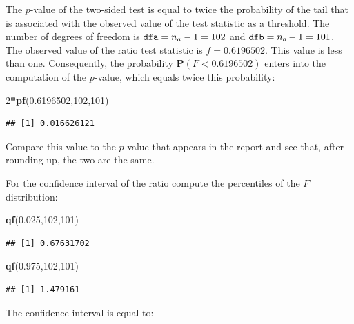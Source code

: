 \documentclass[]{krantz}
\makeatletter
\newenvironment{Shaded}{\begin{snugshade}}{\end{snugshade}}
\newcommand{\DecValTok}[1]{\textcolor[rgb]{0.00,0.00,0.81}{#1}}
\newcommand{\FloatTok}[1]{\textcolor[rgb]{0.00,0.00,0.81}{#1}}
\newcommand{\KeywordTok}[1]{\textcolor[rgb]{0.13,0.29,0.53}{\textbf{#1}}}
\newcommand{\NormalTok}[1]{#1}
\newcommand{\OperatorTok}[1]{\textcolor[rgb]{0.81,0.36,0.00}{\textbf{#1}}}
\newcommand{\Prob}{\mathbf{P}}
\newenvironment{kframe}{%
\medskip{}
\setlength{\fboxsep}{.8em}
 \def\at@end@of@kframe{}%
 \ifinner\ifhmode%
  \def\at@end@of@kframe{\end{minipage}}%
  \begin{minipage}{\columnwidth}%
 \fi\fi%
 \def\FrameCommand##1{\hskip\@totalleftmargin \hskip-\fboxsep
 \colorbox{shadecolor}{##1}\hskip-\fboxsep
     \hskip-\linewidth \hskip-\@totalleftmargin \hskip\columnwidth}%
 \MakeFramed {\advance\hsize-\width
   \@totalleftmargin\z@ \linewidth\hsize
   \@setminipage}}%
 {\par\unskip\endMakeFramed%
 \at@end@of@kframe}
\renewenvironment{Shaded}{\begin{kframe}}{\end{kframe}}
\theoremstyle{definition}
\theoremstyle{definition}
\theoremstyle{definition}
\theoremstyle{remark}
\makeatother
\begin{document}
The \(p\)-value of the two-sided test is equal to twice the probability of
the tail that is associated with the observed value of the test
statistic as a threshold. The number of degrees of freedom is
\(\mbox{\texttt{dfa}} = n_a - 1 = 102\) and
\(\mbox{\texttt{dfb}} = n_b - 1 = 101\). The observed value of the ratio
test statistic is \(f = 0.6196502\). This value is less than one.
Consequently, the probability \(\Prob(F < 0.6196502)\) enters into the
computation of the \(p\)-value, which equals twice this probability:

\begin{Shaded}
\begin{Highlighting}[]
\DecValTok{2}\OperatorTok{*}\KeywordTok{pf}\NormalTok{(}\FloatTok{0.6196502}\NormalTok{,}\DecValTok{102}\NormalTok{,}\DecValTok{101}\NormalTok{)}
\end{Highlighting}
\end{Shaded}

\begin{verbatim}
## [1] 0.016626121
\end{verbatim}

Compare this value to the \(p\)-value that appears in the report and see
that, after rounding up, the two are the same.

For the confidence interval of the ratio compute the percentiles of the
\(F\) distribution:

\begin{Shaded}
\begin{Highlighting}[]
\KeywordTok{qf}\NormalTok{(}\FloatTok{0.025}\NormalTok{,}\DecValTok{102}\NormalTok{,}\DecValTok{101}\NormalTok{)}
\end{Highlighting}
\end{Shaded}

\begin{verbatim}
## [1] 0.67631702
\end{verbatim}

\begin{Shaded}
\begin{Highlighting}[]
\KeywordTok{qf}\NormalTok{(}\FloatTok{0.975}\NormalTok{,}\DecValTok{102}\NormalTok{,}\DecValTok{101}\NormalTok{)}
\end{Highlighting}
\end{Shaded}

\begin{verbatim}
## [1] 1.479161
\end{verbatim}

The confidence interval is equal to:
\end{document}
